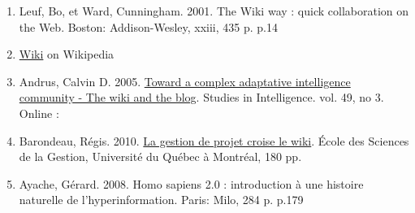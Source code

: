 \begin{enumerate}
\item
  Leuf, Bo, et Ward, Cunningham. 2001. The Wiki way : quick
  collaboration on the Web. Boston: Addison-Wesley, xxiii, 435 p. p.14
\item
  \href{http://en.wikipedia.org/wiki/Wiki}{Wiki} on Wikipedia
\item
  Andrus, Calvin D. 2005. \href{http://ssrn.com/abstract=755904}{Toward
  a complex adaptative intelligence community - The wiki and the blog}.
  Studies in Intelligence. vol. 49, no 3. Online :
\item
  Barondeau, Régis. 2010.
  \href{http://www.regisbarondeau.com/Chapitre+4\%3A+Analyse+du+cas\#Synth\_se}{La
  gestion de projet croise le wiki}. École des Sciences de la Gestion,
  Université du Québec à Montréal, 180 pp.
\item
  Ayache, Gérard. 2008. Homo sapiens 2.0 : introduction à une histoire
  naturelle de l'hyperinformation. Paris: Milo, 284 p. p.179
\end{enumerate}
